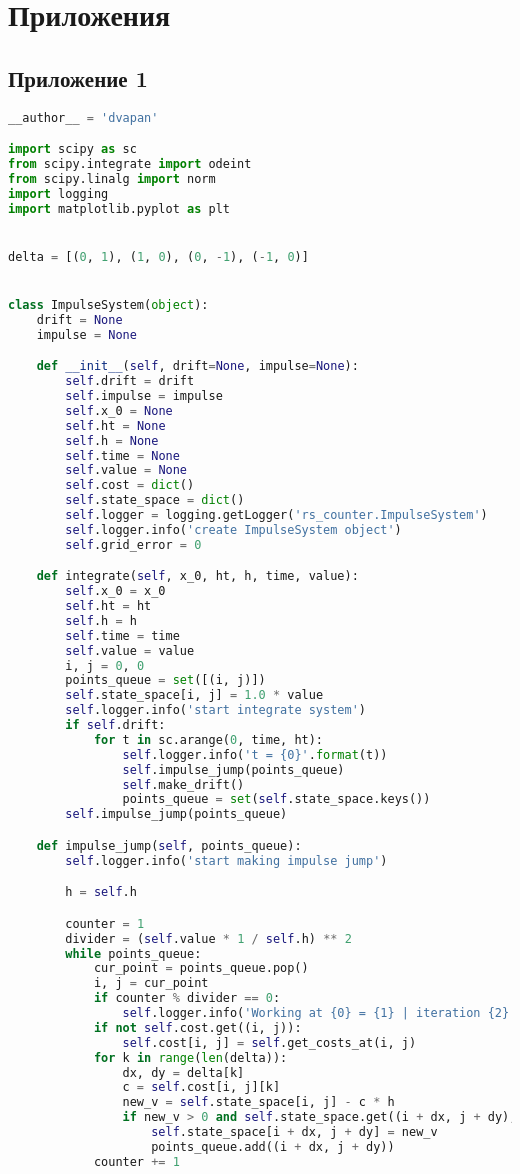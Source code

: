 \pagebreak
\section*{Приложения}
\label{sec:appl}

\normalsize
\subsection*{Приложение 1}
\label{appl_src}

\begin{lstlisting}[language=Python,
caption={Интерфейс Impulse System}]
__author__ = 'dvapan'

import scipy as sc
from scipy.integrate import odeint
from scipy.linalg import norm
import logging
import matplotlib.pyplot as plt


delta = [(0, 1), (1, 0), (0, -1), (-1, 0)]


class ImpulseSystem(object):
    drift = None
    impulse = None

    def __init__(self, drift=None, impulse=None):
        self.drift = drift
        self.impulse = impulse
        self.x_0 = None
        self.ht = None
        self.h = None
        self.time = None
        self.value = None
        self.cost = dict()
        self.state_space = dict()
        self.logger = logging.getLogger('rs_counter.ImpulseSystem')
        self.logger.info('create ImpulseSystem object')
        self.grid_error = 0

    def integrate(self, x_0, ht, h, time, value):
        self.x_0 = x_0
        self.ht = ht
        self.h = h
        self.time = time
        self.value = value
        i, j = 0, 0
        points_queue = set([(i, j)])
        self.state_space[i, j] = 1.0 * value
        self.logger.info('start integrate system')
        if self.drift:
            for t in sc.arange(0, time, ht):
                self.logger.info('t = {0}'.format(t))
                self.impulse_jump(points_queue)
                self.make_drift()
                points_queue = set(self.state_space.keys())
        self.impulse_jump(points_queue)

    def impulse_jump(self, points_queue):
        self.logger.info('start making impulse jump')

        h = self.h

        counter = 1
        divider = (self.value * 1 / self.h) ** 2
        while points_queue:
            cur_point = points_queue.pop()
            i, j = cur_point
            if counter % divider == 0:
                self.logger.info('Working at {0} = {1} | iteration {2}'.format((i, j), self.state_space[i, j], counter))
            if not self.cost.get((i, j)):
                self.cost[i, j] = self.get_costs_at(i, j)
            for k in range(len(delta)):
                dx, dy = delta[k]
                c = self.cost[i, j][k]
                new_v = self.state_space[i, j] - c * h
                if new_v > 0 and self.state_space.get((i + dx, j + dy), 0) < new_v:
                    self.state_space[i + dx, j + dy] = new_v
                    points_queue.add((i + dx, j + dy))
            counter += 1


\end{lstlisting}
